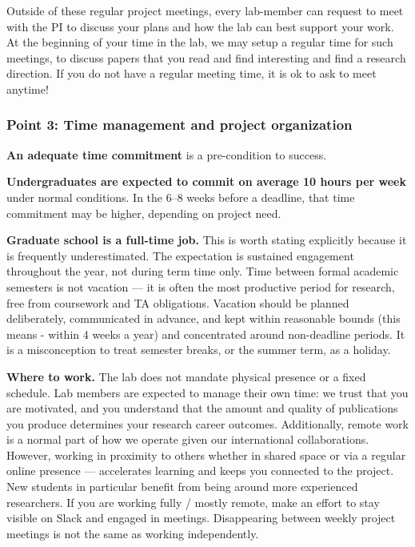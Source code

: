 \documentclass[11pt, letterpaper]{article}
\begin{document}
Outside of these regular project meetings, every lab-member can request to meet with the PI to discuss your plans and how the lab can best support your work. At the beginning of your time in the lab, we may setup a regular time for such meetings, to discuss papers that you read and find interesting and find a research direction. If you do not have a regular meeting time, it is ok to ask to meet anytime!

\subsubsection*{Point 3: Time management and project organization}

\textbf{An adequate time commitment} is a pre-condition to success. 

\textbf{Undergraduates are expected to commit on average 10 hours per week} under normal conditions. In the 6--8 weeks before a deadline, that time commitment may be higher, depending on project need.


\textbf{Graduate school is a full-time job.} This is worth stating explicitly because it is frequently underestimated. The expectation is sustained engagement throughout the year, not during term time only. Time between formal academic semesters is not vacation --- it is often the most productive period for research, free from coursework and TA obligations. Vacation should be planned deliberately, communicated in advance, and kept within reasonable bounds (this means - within 4 weeks a year) and concentrated around 
non-deadline periods. It is a misconception to treat semester breaks, or the summer term, as a 
holiday.

\textbf{Where to work.} The lab does not mandate physical presence or a fixed schedule. Lab members are expected to manage their own time: we trust that you are motivated, and you understand that the amount and quality of publications you produce determines your research career outcomes.
Additionally, remote work is a normal part of how we operate given our international collaborations. 
However, working in proximity to others whether in shared space or via a regular online presence --- accelerates learning and keeps you connected to the project. New students in particular 
benefit from being around more experienced researchers. If you are working fully / mostly remote,  make an effort to stay visible on Slack and engaged in meetings. Disappearing between weekly project meetings is not the same as working independently.
\end{document}
